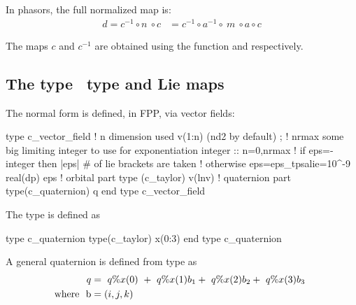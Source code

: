 \documentclass{hitec}     %
\begin{document}
{{{{{{{{{{{{{{{{{{  In phasors, the full normalized map is:
%
\begin{align} d=
{c}^{-1}\circ n\ \circ c&={c}^{-1}\circ {a}^{-1}\circ \ m\ \circ a\circ c \label{eq:normalfp}\end{align}

The maps $c$  and $c^{-1}$ are obtained using the function   and   respectively.
 

  \subsection{The type   ~type and Lie maps}\label{s:vecf}

The normal form is defined, in FPP, via  vector fields: 

\begin{code}
type c_vector_field   
! n dimension used v(1:n) (nd2 by default) ;
! nrmax some big limiting integer to use for exponentiation
 integer :: n=0,nrmax
! if eps=-integer  then |eps| # of lie brackets are taken
! otherwise eps=eps_tpsalie=10^-9
 real(dp) eps
! orbital part
 type (c_taylor) v(lnv)
! quaternion part
 type(c_quaternion) q
 end type c_vector_field
\end{code}
 
 The type  is defined as
 
\begin{code}
type  c_quaternion
 type(c_taylor) x(0:3)
end type c_quaternion
\end{code}
 
 A general quaternion is defined from type  as
\begin{align} q&= \ q\%x(0)\ +\ q\%x(1){b}_{1}+\ q\%x(2){b}_{2}+\ q\%x(3){b}_{3}\ \label{eq:cqua}\\ {\rm w}{\rm h}{\rm e}{\rm r}{\rm e}~~{\rm b}&=\left({i,j,k}\right) \label{eq:cqua}\end{align}

}}}}}}}}}}}}}}}}}}
\end{document}
